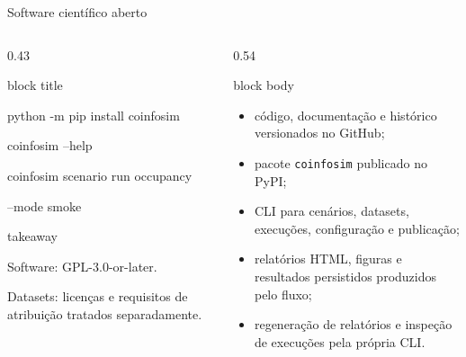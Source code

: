\begin{frame}{Software científico aberto}
  \begin{columns}[T,onlytextwidth]
    \begin{column}{0.43\textwidth}
      \begin{beamercolorbox}[wd=\linewidth,sep=.16cm,rounded=true]{block title}
        {\color{white}\ttfamily\fontsize{8.4}{10.4}\selectfont
          python -m pip install coinfosim\par\medskip
          coinfosim --help\par\medskip
          coinfosim scenario run occupancy\par
          \hspace{1.2em}--mode smoke}
      \end{beamercolorbox}

      \vspace{.10cm}
      \begin{beamercolorbox}[wd=\linewidth,sep=.14cm,rounded=true]{takeaway}
        {\sffamily\fontsize{8.5}{10.2}\selectfont
          Software: GPL-3.0-or-later.\par
          Datasets: licenças e requisitos de atribuição tratados separadamente.}
      \end{beamercolorbox}
    \end{column}
    \begin{column}{0.54\textwidth}
      \begin{beamercolorbox}[wd=\linewidth,sep=.16cm,rounded=true]{block body}
        \begin{itemize}\fontsize{9.0}{10.8}\selectfont\setlength{\itemsep}{.10cm}
          \item código, documentação e histórico versionados no GitHub;
          \item pacote \texttt{coinfosim} publicado no PyPI;
          \item CLI para cenários, datasets, execuções, configuração e publicação;
          \item relatórios HTML, figuras e resultados persistidos produzidos pelo fluxo;
          \item regeneração de relatórios e inspeção de execuções pela própria CLI.
        \end{itemize}
      \end{beamercolorbox}
    \end{column}
  \end{columns}


\end{frame}
